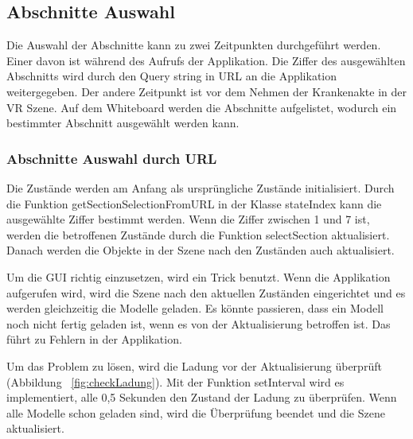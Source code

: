  \subsection{Abschnitte Auswahl}
 Die Auswahl der Abschnitte kann zu zwei Zeitpunkten durchgeführt werden. Einer davon ist während des Aufrufs der Applikation. Die Ziffer des ausgewählten Abschnitts wird durch den Query string in URL an die Applikation weitergegeben. Der andere Zeitpunkt ist vor dem Nehmen der Krankenakte in der VR Szene. Auf dem Whiteboard werden die Abschnitte aufgelistet, wodurch ein bestimmter Abschnitt ausgewählt werden kann.
 
  \subsubsection{Abschnitte Auswahl durch URL}
  Die Zustände werden am Anfang als ursprüngliche Zustände initialisiert. Durch die Funktion {\selectfont getSectionSelectionFromURL} in der Klasse {\selectfont stateIndex} kann die ausgewählte Ziffer bestimmt werden. Wenn die Ziffer zwischen 1 und 7 ist, werden die betroffenen Zustände durch die Funktion {\selectfont selectSection} aktualisiert. Danach werden die Objekte in der Szene nach den Zuständen auch aktualisiert.
  
  Um die GUI richtig einzusetzen, wird ein Trick benutzt. Wenn die Applikation aufgerufen wird, wird die Szene nach den aktuellen Zuständen eingerichtet und es werden gleichzeitig die Modelle geladen. Es könnte passieren, dass ein Modell noch nicht fertig geladen ist, wenn es von der Aktualisierung betroffen ist. Das führt zu Fehlern in der Applikation.
  
  Um das Problem zu lösen, wird die Ladung vor der Aktualisierung überprüft (Abbildung ~\ref{fig:checkLadung}). Mit der Funktion {\selectfont setInterval} wird es implementiert, alle 0,5 Sekunden den Zustand der Ladung zu überprüfen. Wenn alle Modelle schon geladen sind, wird die Überprüfung beendet und die Szene aktualisiert.
  
